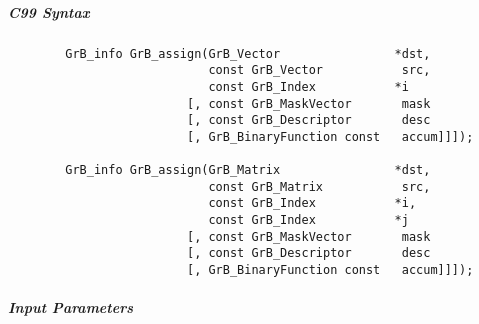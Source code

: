 \subparagraph{C99 Syntax}

\begin{verbatim}
        GrB_info GrB_assign(GrB_Vector                *dst,
                            const GrB_Vector           src,
                            const GrB_Index           *i
                         [, const GrB_MaskVector       mask
                         [, const GrB_Descriptor       desc
                         [, GrB_BinaryFunction const   accum]]]);

        GrB_info GrB_assign(GrB_Matrix                *dst,
                            const GrB_Matrix           src,
                            const GrB_Index           *i,
                            const GrB_Index           *j
                         [, const GrB_MaskVector       mask
                         [, const GrB_Descriptor       desc
                         [, GrB_BinaryFunction const   accum]]]);
\end{verbatim}

\subparagraph{Input Parameters}

